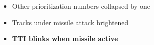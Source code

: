 \documentclass[fontInter]{TechCheck}
\begin{document}
\begin{longtableitemize}
{\begin{tableminipage}
\begin{itemize}
\begin{itemize}
					\item Other prioritization numbers collapsed by one
					\item Tracks under missile attack brightened
					\item \textbf{TTI blinks when missile active}
				\end{itemize}
			\end{itemize}
		\end{tableminipage}}
	\end{longtableitemize}
\end{document}
